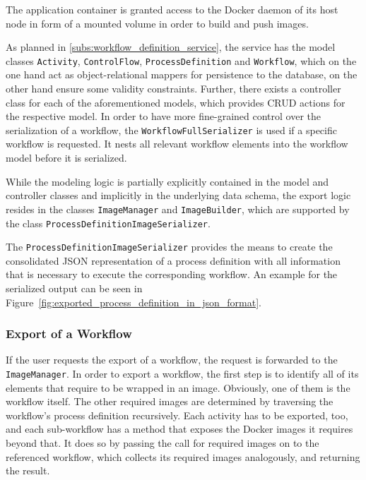     The application container is granted access to the Docker daemon of its host node in form of a mounted volume in order to build and push images.

    As planned in \ref{subs:workflow_definition_service}, the service has the model classes \texttt{Activity}, \texttt{ControlFlow}, \texttt{ProcessDefinition} and \texttt{Workflow}, which on the one hand act as object-relational mappers for persistence to the database, on the other hand ensure some validity constraints. Further, there exists a controller class for each of the aforementioned models, which provides \ac{CRUD} actions for the respective model. In order to have more fine-grained control over the serialization of a workflow, the \texttt{WorkflowFullSerializer} is used if a specific workflow is requested. It nests all relevant workflow elements into the workflow model before it is serialized.

    While the modeling logic is partially explicitly contained in the model and controller classes and implicitly in the underlying data schema, the export logic resides in the classes \texttt{ImageManager} and \texttt{ImageBuilder}, which are supported by the class \texttt{ProcessDefinitionImageSerializer}.

    The \texttt{ProcessDefinitionImageSerializer} provides the means to create the consolidated JSON representation of a process definition with all information that is necessary to execute the corresponding workflow. An example for the serialized output can be seen in Figure~\ref{fig:exported_process_definition_in_json_format}.

    \subsubsection{Export of a Workflow} %
      \label{ssub:exporting_a_workflow}
      If the user requests the export of a workflow, the request is forwarded to the \texttt{ImageManager}.
      In order to export a workflow, the first step is to identify all of its elements that require to be wrapped in an image. Obviously, one of them is the workflow itself. The other required images are determined by traversing the workflow's process definition recursively. Each activity has to be exported, too, and each sub-workflow has a method that exposes the Docker images it requires beyond that. It does so by passing the call for required images on to the referenced workflow, which collects its required images analogously, and returning the result.

